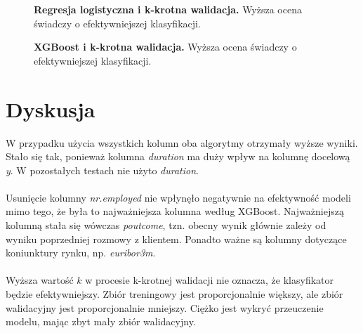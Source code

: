 \documentclass[12pt,a4paper]{article}
\begin{document}
\begin{figure}[H]
	\centering
	\caption{\textbf{Regresja logistyczna i k-krotna walidacja.} Wyższa ocena świadczy o efektywniejszej klasyfikacji.}
\end{figure}

\begin{figure}[H]
	\centering
	\caption{\textbf{XGBoost i k-krotna walidacja.} Wyższa ocena świadczy o efektywniejszej klasyfikacji.}
\end{figure}

\section*{Dyskusja}
W przypadku użycia wszystkich kolumn oba algorytmy otrzymały wyższe wyniki. Stało się tak, ponieważ kolumna \textit{duration} ma duży wpływ na kolumnę docelową \textit{y}. W pozostałych testach nie użyto \textit{duration}.
\\
\\
Usunięcie kolumny \textit{nr.employed} nie wpłynęło negatywnie na efektywność modeli mimo tego, że była to najważniejsza kolumna według XGBoost. Najważniejszą kolumną stała się wówczas \textit{poutcome}, tzn. obecny wynik głównie zależy od wyniku poprzedniej rozmowy z klientem. Ponadto ważne są kolumny dotyczące koniunktury rynku, np. \textit{euribor3m}.
\\
\\
Wyższa wartość $k$ w procesie k-krotnej walidacji nie oznacza, że klasyfikator będzie efektywniejszy. Zbiór treningowy jest proporcjonalnie większy, ale zbiór walidacyjny jest proporcjonalnie mniejszy. Ciężko jest wykryć przeuczenie modelu, mając zbyt mały zbiór walidacyjny.
\end{document}
